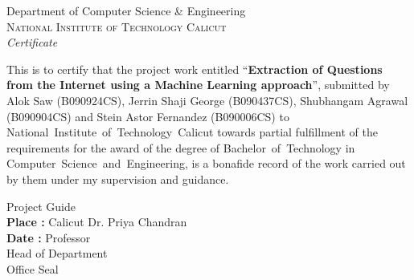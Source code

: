 \pagestyle{plain}
\begin{center}
	\huge{Department of Computer Science \& Engineering}\\[0.5cm]
	\normalsize
	\textsc{National Institute of Technology Calicut}\\[2.0cm]
	\emph{\LARGE Certificate}\\[2.5cm]
\end{center}
This is to certify that the project work entitled ``\textbf{Extraction of Questions from the Internet using a Machine Learning approach}'', 
submitted by Alok Saw (B090924CS), Jerrin Shaji George (B090437CS), Shubhangam Agrawal (B090904CS) and Stein Astor Fernandez (B090006CS) to National~Institute~of~Technology~Calicut towards 
partial fulfillment of the requirements for the award of the degree of Bachelor~of~Technology 
in Computer~Science~and~Engineering, is a bonafide record of the work carried out by them 
under my supervision and guidance.

\vspace*{1.5cm}
\noindent

\hfill Project Guide\\
\textbf{Place :} Calicut \hfill Dr. Priya Chandran\\
\textbf{Date :}  \hfill Professor\\

\vspace*{2cm}
\hfill Head of Department\\

\vspace*{2cm}
\hfill Office Seal\\
